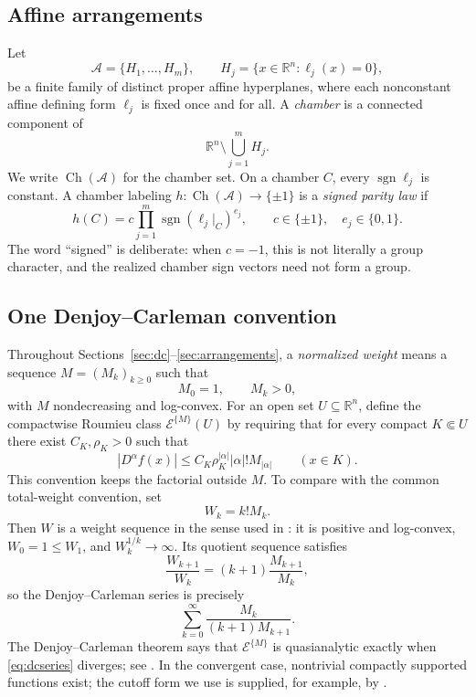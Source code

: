 \documentclass[11pt]{article}
\theoremstyle{definition}
\theoremstyle{remark}
\newcommand{\R}{\mathbb{R}}
\newcommand{\bits}{\{0,1\}}
\newcommand{\sign}{\operatorname{sgn}}
\newcommand{\Ch}{\operatorname{Ch}}
\newcommand{\cA}{\mathcal{A}}
\begin{document}
\subsection{Affine arrangements}

Let
\[
 \cA=\{H_1,\dots,H_m\},\qquad H_j=\{x\in\R^n:\ell_j(x)=0\},
\]
be a finite family of distinct proper affine hyperplanes, where each nonconstant affine defining form $\ell_j$ is fixed once and for all. A \emph{chamber} is a connected component of
\[
 \R^n\setminus\bigcup_{j=1}^m H_j.
\]
We write $\Ch(\cA)$ for the chamber set. On a chamber $C$, every $\sign\ell_j$ is constant. A chamber labeling $h:\Ch(\cA)\to\{\pm1\}$ is a \emph{signed parity law} if
\begin{equation}\label{eq:signed-parity}
 h(C)=c\prod_{j=1}^m \sign(\ell_j|_C)^{e_j},
 \qquad c\in\{\pm1\},\quad e_j\in\bits.
\end{equation}
The word ``signed'' is deliberate: when $c=-1$, this is not literally a group character, and the realized chamber sign vectors need not form a group.

\subsection{One Denjoy--Carleman convention}

Throughout Sections~\ref{sec:dc}--\ref{sec:arrangements}, a \emph{normalized weight} means a sequence $M=(M_k)_{k\ge0}$ such that
\[
 M_0=1,
 \qquad M_k>0,
\]
with $M$ nondecreasing and log-convex. For an open set $U\subseteq\R^n$, define the compactwise Roumieu class $\mathcal{E}^{\{M\}}(U)$ by requiring that for every compact $K\Subset U$ there exist $C_K,\rho_K>0$ such that
\begin{equation}\label{eq:roumieu}
 |D^\alpha f(x)|
 \le C_K\rho_K^{|\alpha|}|\alpha|!M_{|\alpha|}
 \qquad (x\in K).
\end{equation}
This convention keeps the factorial outside $M$. To compare with the common total-weight convention, set
\[
 W_k=k!M_k.
\]
Then $W$ is a weight sequence in the sense used in \cite{Rainer2022}: it is positive and log-convex, $W_0=1\le W_1$, and $W_k^{1/k}\to\infty$. Its quotient sequence satisfies
\[
 \frac{W_{k+1}}{W_k}
 =(k+1)\frac{M_{k+1}}{M_k},
\]
so the Denjoy--Carleman series is precisely
\begin{equation}\label{eq:dcseries}
 \sum_{k=0}^{\infty}\frac{M_k}{(k+1)M_{k+1}}.
\end{equation}
The Denjoy--Carleman theorem says that $\mathcal{E}^{\{M\}}$ is quasianalytic exactly when \eqref{eq:dcseries} diverges; see \cite[Theorem~3.6]{Rainer2022}. In the convergent case, nontrivial compactly supported functions exist; the cutoff form we use is supplied, for example, by \cite[Corollary~3.12]{Rainer2022}.
\end{document}
